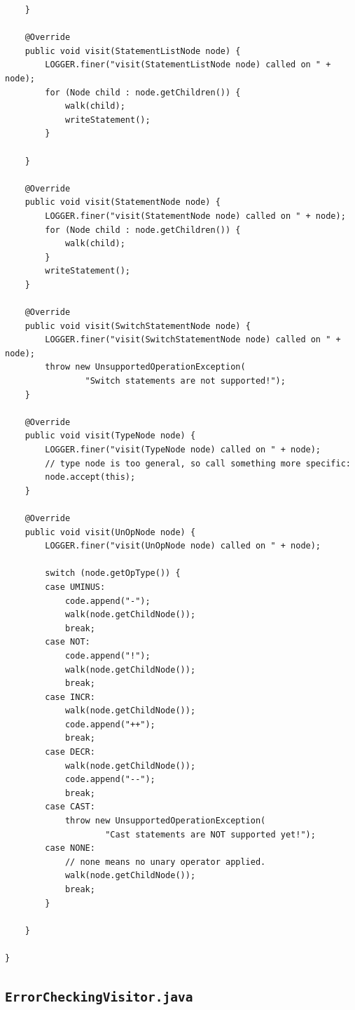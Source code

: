 \documentclass{report}
\begin{document}
\begin{verbatim}
	}

	@Override
	public void visit(StatementListNode node) {
		LOGGER.finer("visit(StatementListNode node) called on " + node);
		for (Node child : node.getChildren()) {
			walk(child);
			writeStatement();
		}

	}

	@Override
	public void visit(StatementNode node) {
		LOGGER.finer("visit(StatementNode node) called on " + node);
		for (Node child : node.getChildren()) {
			walk(child);
		}
		writeStatement();
	}

	@Override
	public void visit(SwitchStatementNode node) {
		LOGGER.finer("visit(SwitchStatementNode node) called on " + node);
		throw new UnsupportedOperationException(
				"Switch statements are not supported!");
	}

	@Override
	public void visit(TypeNode node) {
		LOGGER.finer("visit(TypeNode node) called on " + node);
		// type node is too general, so call something more specific:
		node.accept(this);
	}

	@Override
	public void visit(UnOpNode node) {
		LOGGER.finer("visit(UnOpNode node) called on " + node);

		switch (node.getOpType()) {
		case UMINUS:
			code.append("-");
			walk(node.getChildNode());
			break;
		case NOT:
			code.append("!");
			walk(node.getChildNode());
			break;
		case INCR:
			walk(node.getChildNode());
			code.append("++");
			break;
		case DECR:
			walk(node.getChildNode());
			code.append("--");
			break;
		case CAST:
			throw new UnsupportedOperationException(
					"Cast statements are NOT supported yet!");
		case NONE:
			// none means no unary operator applied.
			walk(node.getChildNode());
			break;
		}

	}

}
\end{verbatim}

\subsection{\texttt{ErrorCheckingVisitor.java}}
\end{document}
